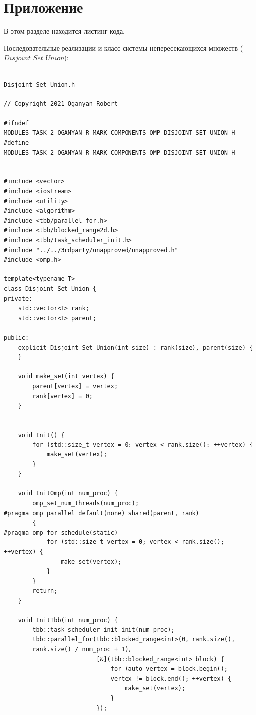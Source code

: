 \documentclass{report}
\begin{document}
\section*{Приложение}
\par В этом разделе находится листинг кода.
\par Последовательные реализации и класс системы непересекающихся множеств ($Disjoint\_Set\_Union$):
\begin{lstlisting}

Disjoint_Set_Union.h

// Copyright 2021 Oganyan Robert

#ifndef MODULES_TASK_2_OGANYAN_R_MARK_COMPONENTS_OMP_DISJOINT_SET_UNION_H_
#define MODULES_TASK_2_OGANYAN_R_MARK_COMPONENTS_OMP_DISJOINT_SET_UNION_H_


#include <vector>
#include <iostream>
#include <utility>
#include <algorithm>
#include <tbb/parallel_for.h>
#include <tbb/blocked_range2d.h>
#include <tbb/task_scheduler_init.h>
#include "../../3rdparty/unapproved/unapproved.h"
#include <omp.h>

template<typename T>
class Disjoint_Set_Union {
private:
    std::vector<T> rank;
    std::vector<T> parent;

public:
    explicit Disjoint_Set_Union(int size) : rank(size), parent(size) {
    }

    void make_set(int vertex) {
        parent[vertex] = vertex;
        rank[vertex] = 0;
    }


    void Init() {
        for (std::size_t vertex = 0; vertex < rank.size(); ++vertex) {
            make_set(vertex);
        }
    }

    void InitOmp(int num_proc) {
        omp_set_num_threads(num_proc);
#pragma omp parallel default(none) shared(parent, rank)
        {
#pragma omp for schedule(static)
            for (std::size_t vertex = 0; vertex < rank.size(); ++vertex) {
                make_set(vertex);
            }
        }
        return;
    }

    void InitTbb(int num_proc) {
        tbb::task_scheduler_init init(num_proc);
        tbb::parallel_for(tbb::blocked_range<int>(0, rank.size(),
        rank.size() / num_proc + 1),
                          [&](tbb::blocked_range<int> block) {
                              for (auto vertex = block.begin();
                              vertex != block.end(); ++vertex) {
                                  make_set(vertex);
                              }
                          });


\end{lstlisting}
\end{document}
